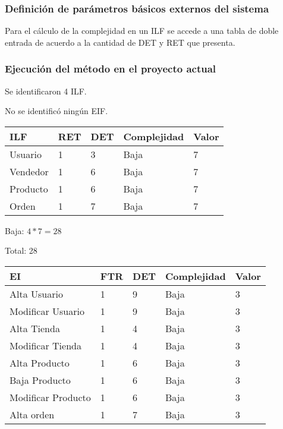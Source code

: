       \subsubsection{Definición de parámetros básicos externos del sistema}

Para el cálculo de la complejidad en un ILF se accede a una tabla de doble entrada de acuerdo a la cantidad de DET y RET que presenta.
      
      \subsubsection{Ejecución del método en el proyecto actual}
      
    Se identificaron 4 ILF.
    
    No se identificó ningún EIF.
    
    \begin{table}[H]
    \centering
    \begin{tabular}{|l|l|l|l|l|}
        \hline
        ILF      & RET & DET & Complejidad & Valor \\ \hline
        Usuario  & 1   & 3   & Baja        & 7     \\ \hline
        Vendedor & 1   & 6   & Baja        & 7     \\ \hline
        Producto & 1   & 6   & Baja        & 7     \\ \hline
        Orden    & 1   & 7   & Baja        & 7     \\
        \hline
    \end{tabular}
\end{table}

Baja: $4 * 7 = 28$

Total: 28

      \begin{table}[H]
      \centering
    \begin{tabular}{|l|l|l|l|l|}
        \hline
        EI                 & FTR & DET & Complejidad & Valor \\ \hline
        Alta Usuario       & 1   & 9   & Baja        & 3     \\ \hline
        Modificar Usuario  & 1   & 9   & Baja        & 3     \\ \hline
        Alta Tienda        & 1   & 4   & Baja        & 3     \\ \hline
        Modificar Tienda   & 1   & 4   & Baja        & 3     \\ \hline
        Alta Producto      & 1   & 6   & Baja        & 3     \\ \hline
        Baja Producto      & 1   & 6   & Baja        & 3     \\ \hline
        Modificar Producto & 1   & 6   & Baja        & 3     \\ \hline
        Alta orden         & 1   & 7   & Baja        & 3     \\ \hline
    \end{tabular}
\end{table}

